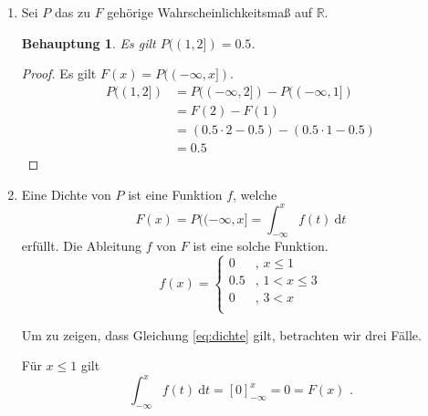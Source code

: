 \documentclass[a4paper]{scrartcl}
\newtheorem*{behaupt}{Behauptung}
\begin{document}
\begin{enumerate}[label=\bfseries\arabic*.]
\begin{enumerate}[label=(\alph*)]
            \item
                Sei $P$ das zu $F$ gehörige Wahrscheinlichkeitsmaß auf
                $\mathbb{R}$.
                \begin{behaupt}
                Es gilt $P((1, 2]) = \num{0,5}$.
                \end{behaupt}
                \begin{proof}
                    Es gilt $F(x) = P((-\infty, x])$.
                    \begin{equation*}
                        \begin{split}
                            P ((1, 2]) &= P((-\infty, 2]) - P((-\infty, 1]) \\
                            &= F(2) - F(1) \\
                            &= (\num{0,5} \cdot 2 - \num{0,5})
                            - (\num{0,5} \cdot 1 - \num{0,5}) \\
                            &= \num{0,5}
                        \end{split}
                    \end{equation*}
                \end{proof}

            \item
                Eine Dichte von $P$ ist eine Funktion $f$, welche
                \begin{equation}
                    F(x) = P((-\infty, x] = \int_{-\infty}^x f(t) \ \textrm{d}t
                    \label{eq:dichte}
                \end{equation}
                erfüllt.
                Die Ableitung $f$ von $F$ ist eine solche Funktion.
                \begin{equation*}
                    f(x) =
                    \begin{cases}
                        0 & \text{, } x \leq 1 \\
                        \num{0,5} & \text{, } 1 < x \leq 3 \\
                        0 & \text{, } 3 < x \\
                    \end{cases}
                \end{equation*}
                
                Um zu zeigen, dass Gleichung \eqref{eq:dichte} gilt, betrachten
                wir drei Fälle.

                Für $x \leq 1$ gilt
                \begin{equation*}
                    \int_{-\infty}^x f(t)\ \textrm{d}{t}
                    = [0]_{-\infty}^x = 0 = F(x) \text{ .}
                \end{equation*}


\end{enumerate}
\end{enumerate}
\end{document}
